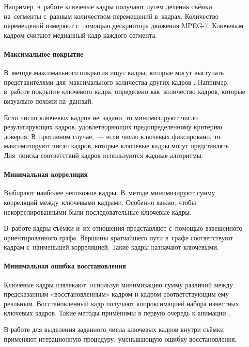 Например, в~работе \cite{Divakaran:2002} ключевые кадры получают путем
деления съёмки на~сегменты с~равным количеством перемещений в~кадрах.
Количество перемещений измеряют с~помощью дескриптора движения
MPEG-7. Ключевым кадром считают медианный кадр каждого сегмента.

\paragraph{Максимальное покрытие}

В~методе максимального покрытия ищут кадры, которые могут
выступать представителями для~максимального количества других
кадров \cite{Truong:2007}.
Например, в~работе \cite{Chang:1999} покрытие ключевого кадра, определено
как~количество кадров, которые визуально похожи на~данный.

Если число ключевых кадров не~задано,
то минимизируют число результирующих кадров,
удовлетворяющих предопределенному критерию доверия.
В~противном случае,~— если число ключевых фиксировано, то
максимизируют число кадров, которые ключевые кадры
могут представлять \cite{Rong:2004} \cite{Cooper:2005}
Для~поиска соответствий кадров используются жадные алгоритмы.


\paragraph{Минимальная корреляция}

Выбирают наиболее непохожие кадры.
В~методе минимизируют сумму корреляций между~ключевыми кадрами,
Особенно важно, чтобы  некоррелированными были последовательные ключевые кадры.

В~работе \cite{Porter:2003} кадры съёмки и~их отношения представляют
с~помощью взвешенного ориентированного графа.
Вершины кратчайшего пути в~графе соответствуют кадрам
с~наименьшей корреляцией. Такие кадры назначают ключевыми.


\paragraph{Минимальная ошибка восстановления}


Ключевые кадры извлекают, используя минимизацию сумму различий между
предсказанным «восстановленным» кадром и кадром соответствующим ему реальным.
Восстановленный кадр получают аппроксимацией набора известных ключевых кадров.
Такие методы применимы в первую очередь к анимации \cite{Hu:2011}.

В работе \cite{Lee:2003} для выделения заданного числа
ключевых кадров внутри съёмки применяют итерационную процедуру,
уменьшающую ошибку восстановления.


